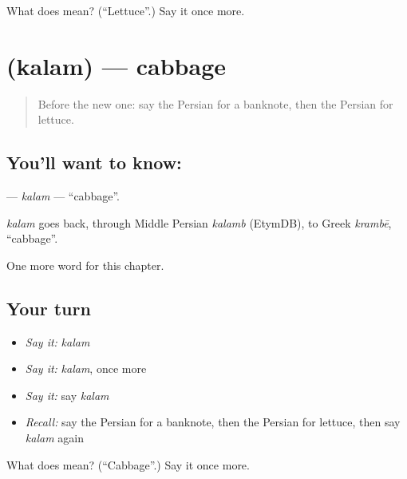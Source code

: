 \begin{tcolorbox}[breakable,colback=teal!4,colframe=teal!35!black,title={Before you move on}]
What does  mean? (\textquotedblleft{}Lettuce\textquotedblright{}.) Say it once more.
\end{tcolorbox}
\section[\texorpdfstring{\fa{کلم} (kalam)}{کلم (kalam)}]{ (kalam) — cabbage}

\label{lesson:FA-C275-kalam}



\begin{quote}
Before the new one: say the Persian for a banknote, then the Persian for lettuce.
\end{quote}

\subsection*{You'll want to know: }
\textbf{} — \emph{kalam} — \textquotedblleft{}cabbage\textquotedblright{}.

\begin{cousinweb}
\emph{kalam} goes back, through Middle Persian \emph{kalamb} (EtymDB), to Greek \emph{krambē}, \textquotedblleft{}cabbage\textquotedblright{}.
\end{cousinweb}

\begin{grammarlens}[title={What you've built}]
One more word for this chapter.
\end{grammarlens}

\subsection*{Your turn}
\begin{itemize}
\raggedright
  \item \emph{Say it:} \emph{kalam}
  \item \emph{Say it:} \emph{kalam}, once more
  \item \emph{Say it:} say \emph{kalam}
  \item \emph{Recall:} say the Persian for a banknote, then the Persian for lettuce, then say \emph{kalam} again
\end{itemize}

\begin{tcolorbox}[breakable,colback=teal!4,colframe=teal!35!black,title={Before you move on}]
What does  mean? (\textquotedblleft{}Cabbage\textquotedblright{}.) Say it once more.
\end{tcolorbox}
